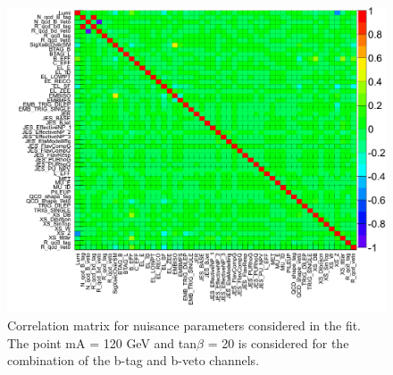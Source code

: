 \begin{figure}[htp]
     \begin{center}

           \includegraphics[width=\textwidth]{figure/np_check/comb_unconditiona_matrixl.png}
    \end{center}
    \caption{ Correlation matrix for nuisance parameters considered in the fit.  The point mA = 120 GeV and tan$\beta$ = 20 is considered for the combination of the b-tag and b-veto channels.} 
    \label{fig:np_correlation_comb}
\end{figure}


